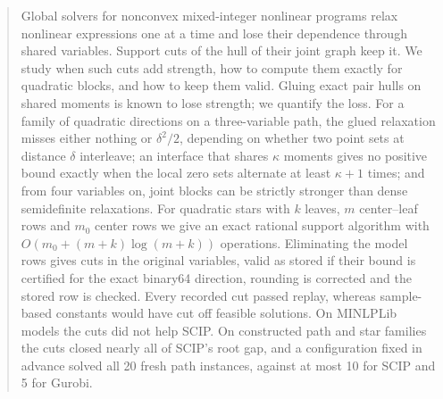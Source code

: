 \begin{abstract}
Global solvers for nonconvex mixed-integer nonlinear programs relax nonlinear
expressions one at a time and lose their dependence through shared variables.
Support cuts of the hull of their joint graph keep it. We study when
such cuts add strength, how to compute them exactly for quadratic blocks, and
how to keep them valid. Gluing exact pair hulls on
shared moments is known to lose strength; we quantify the loss. For a family of
quadratic directions on a three-variable path, the glued relaxation misses
either nothing or $\delta^2/2$, depending on whether two point sets at distance
$\delta$ interleave; an interface that shares
$\kappa$ moments gives no positive bound exactly when the local zero sets
alternate at least $\kappa+1$ times; and from four variables on, joint blocks
can be strictly stronger than dense semidefinite relaxations. For quadratic stars
with $k$ leaves, $m$ center--leaf rows and $m_0$ center rows we give an exact
rational support algorithm with $O(m_0+(m+k)\log(m+k))$ operations. Eliminating
the model rows gives cuts in the original variables, valid as stored if their
bound is certified for the exact binary64 direction, rounding is corrected and
the stored row is checked. Every recorded cut passed replay, whereas
sample-based constants would have cut off feasible solutions. On MINLPLib
models the cuts did not help SCIP. On constructed path and star families
the cuts closed nearly all of SCIP's root gap, and a configuration
fixed in advance solved all 20 fresh path instances, against at most 10 for
SCIP and 5 for Gurobi.
\end{abstract}
